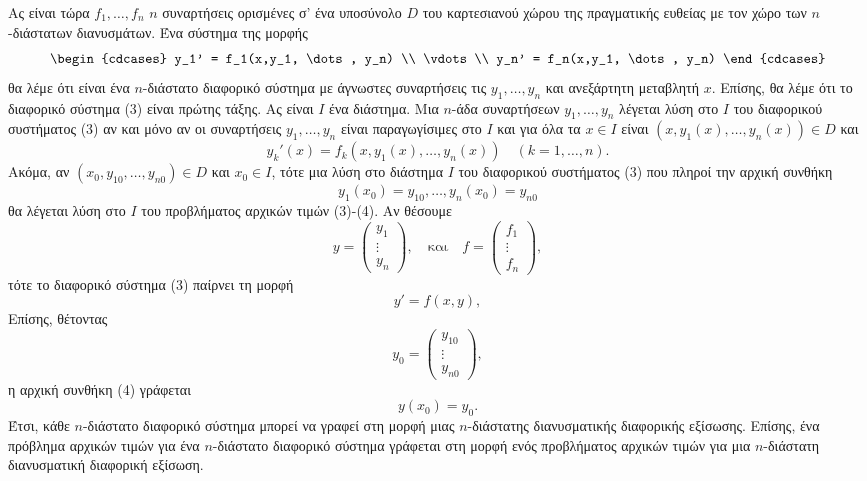 \documentclass[11pt,a4paper,twoside]{book}
\begin{document}
Ας είναι τώρα $f_1, \dots, f_n$ $n$ συναρτήσεις ορισμένες σ' ένα υποσύνολο $D$ του καρτεσιανού χώρου της πραγματικής ευθείας με τον χώρο των $n$-διάστατων διανυσμάτων. Ένα σύστημα της μορφής
\begin{equation}
\begin{cdcases}
y_1' = f_1(x,y_1, \dots, y_n) \\
\vdots \\
y_n' = f_n(x,y_1, \dots, y_n)
\end{cdcases}
\end{equation}
θα λέμε ότι είναι ένα $n$-διάστατο διαφορικό σύστημα με άγνωστες συναρτήσεις τις $y_1, \dots, y_n$ και ανεξάρτητη μεταβλητή $x$. Επίσης, θα λέμε ότι το διαφορικό σύστημα (3) είναι πρώτης τάξης. Ας είναι $I$ ένα διάστημα. Μια $n$-άδα συναρτήσεων $y_1, \dots, y_n$ λέγεται λύση στο $I$ του διαφορικού συστήματος (3) αν και μόνο αν οι συναρτήσεις $y_1, \dots, y_n$ είναι παραγωγίσιμες στο $I$ και για όλα τα $x \in I$ είναι $(x,y_1(x), \dots, y_n(x)) \in D$ και
\[
y_k'(x) = f_k(x,y_1(x), \dots, y_n(x)) \quad (k=1,\dots,n).
\]
Ακόμα, αν $(x_0,y_{10}, \dots, y_{n0}) \in D$ και $x_0 \in I$, τότε μια λύση στο διάστημα $I$ του διαφορικού συστήματος (3) που πληροί την αρχική συνθήκη
\begin{equation}
y_1(x_0)=y_{10}, \dots, y_n(x_0)=y_{n0}
\end{equation}
θα λέγεται λύση στο $I$ του προβλήματος αρχικών τιμών (3)-(4). Αν θέσουμε
\[
y = \begin{pmatrix} y_1 \\ \vdots \\ y_n \end{pmatrix}, \quad \text{και} \quad f = \begin{pmatrix} f_1 \\ \vdots \\ f_n \end{pmatrix},
\]
τότε το διαφορικό σύστημα (3) παίρνει τη μορφή
\begin{equation*} \label{eq:3prime}
y' = f(x,y), \tag{3'}
\end{equation*}
Επίσης, θέτοντας
\[
y_0 = \begin{pmatrix} y_{10} \\ \vdots \\ y_{n0} \end{pmatrix},
\]
η αρχική συνθήκη (4) γράφεται
\begin{equation*} \label{eq:4prime}
y(x_0) = y_0. \tag{4'}
\end{equation*}
Έτσι, κάθε $n$-διάστατο διαφορικό σύστημα μπορεί να γραφεί στη μορφή μιας $n$-διάστατης διανυσματικής διαφορικής εξίσωσης. Επίσης, ένα πρόβλημα αρχικών τιμών για ένα $n$-διάστατο διαφορικό σύστημα γράφεται στη μορφή ενός προβλήματος αρχικών τιμών για μια $n$-διάστατη διανυσματική διαφορική εξίσωση.
\end{document}
